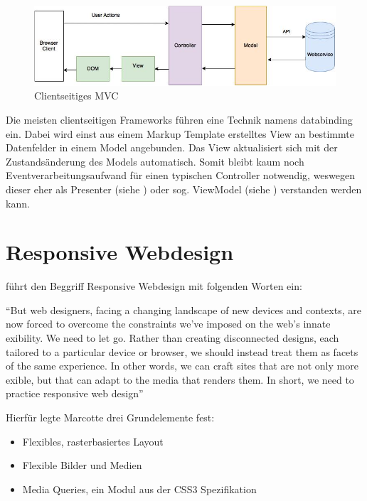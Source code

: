 \begin{figure}[htp]     %
\centering
\includegraphics[width=1.0\textwidth]{images/client_side_mvc}
\caption{Clientseitiges MVC}\label{fig:client_side_mvc}
\end{figure}

Die meisten clientseitigen Frameworks führen eine Technik namens \gls{databinding} ein. Dabei wird einst aus einem Markup Template erstelltes View an bestimmte Datenfelder in einem Model angebunden. Das View aktualisiert sich mit der Zustandsänderung des Models automatisch. Somit bleibt kaum noch Eventverarbeitungsaufwand für einen typischen Controller notwendig, weswegen dieser eher als Presenter (siehe \cite{MSDN:2016:MVP}) oder sog. ViewModel (siehe \cite{MSDN:2016:MVVM}) verstanden werden kann.


\section{Responsive Webdesign}

\cite[S.8]{Marcotte:2011} führt den Beggriff Responsive Webdesign mit folgenden Worten ein:

\enquote{But web designers, facing a changing landscape of new devices and contexts, are now forced to overcome the constraints we’ve imposed on the web’s innate  exibility.
We need to let go.
Rather than creating disconnected designs, each tailored to a particular device or browser, we should instead treat them as facets of the same experience. In other words, we can craft sites that are not only more  exible, but that can adapt to the media that renders them.
In short, we need to practice responsive web design}

Hierfür legte Marcotte drei Grundelemente fest:

\begin{itemize}
 \item Flexibles, rasterbasiertes Layout
 \item Flexible Bilder und Medien
 \item Media Queries, ein Modul aus der CSS3 Spezifikation
\end{itemize}

